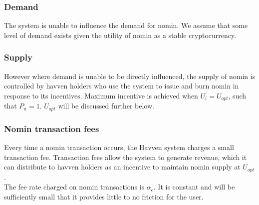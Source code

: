 \begin{center}
\end{center}
	
\subsubsection*{Demand}

\noindent The system is unable to influence the demand for nomin. We assume that some level of demand exists given the utility of nomin as a stable cryptocurrency.

\subsubsection*{Supply}

\noindent However where demand is unable to be directly influenced, the supply of nomin is controlled by havven holders who use the system to issue and burn nomin in response to its incentives. Maximum incentive is achieved when $U_i = U_{opt}$, such that $P_n = 1$. $U_{opt}$ will be discussed further below. \\

\newpage
\subsubsection{Nomin transaction fees} Every time a nomin transaction occurs, the Havven system charges a small transaction fee. Transaction fees allow the system to generate revenue, which it can distribute to havven holders as an incentive to maintain nomin supply at $U_{opt}$. \\

\noindent The fee rate charged on nomin transactions is $\alpha_c$. It is constant and will be sufficiently small that it provides little to no friction for the user.\\

